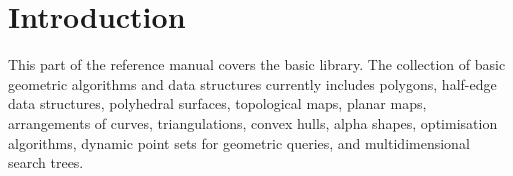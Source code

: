 \cleardoublepage


\chapter{Introduction}



This part of the reference manual covers the basic library.
The collection of basic geometric algorithms and data structures
currently includes polygons, half-edge data structures, polyhedral surfaces, 
topological maps, planar maps, arrangements of curves, triangulations, 
convex hulls, alpha shapes, optimisation algorithms, dynamic
point sets for geometric queries, and multidimensional search trees.



